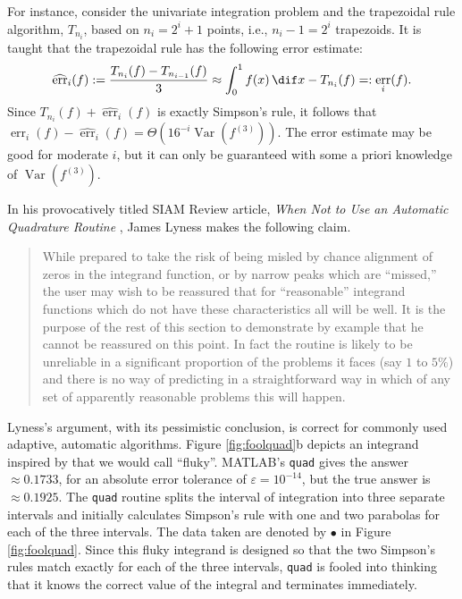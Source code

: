 \documentclass[]{elsarticle}
\DeclareMathOperator{\Var}{Var}
\DeclareMathOperator{\err}{err}
\newcommand{\herr}{\widehat{\err}}
\theoremstyle{definition}
\theoremstyle{remark}
\begin{document}
For instance, consider the univariate integration problem and the trapezoidal rule algorithm, $T_{n_i}$, based on $n_i=2^i+1$ points, i.e., $n_i-1=2^i$ trapezoids.  It is taught that the trapezoidal rule has the following error estimate:
\begin{equation} \label{traperrest}
\herr_i(f):=\frac{T_{n_{i}}(f)-T_{n_{i-1}}(f)}{3} \approx \int_0^1 f(x) \, \dif x - T_{n_i}(f) =:\err_i(f).
\end{equation}
Since $T_{n_i}(f)+ \herr_i(f)$ is exactly Simpson's rule, it follows that $\err_i(f) -\herr_i(f) = \Theta(16^{-i} \Var(f^{(3)}))$.  The error estimate may be good for moderate $i$, but it can only be guaranteed with some a priori knowledge of $\Var(f^{(3)})$.

In his provocatively titled SIAM Review article, \emph{When Not to Use an Automatic Quadrature Routine} \cite[p.\ 69]{Lyn83}, James Lyness makes the following claim.
\begin{quote}
While prepared to take the risk of being misled by chance alignment of zeros in the integrand function, or by narrow peaks which are ``missed,'' the user may wish to be reassured that for ``reasonable'' integrand functions which do not have these characteristics all will be well. It is the purpose of the rest of this section to demonstrate by example that he cannot be reassured on this point. In fact the routine is likely to be unreliable in a significant proportion of the problems it faces (say $1$ to $5\%$) and there is no way of predicting in a straightforward way in which of any set of apparently reasonable problems this will happen.
\end{quote}

Lyness's argument, with its pessimistic conclusion, is correct for commonly used adaptive, automatic algorithms.  Figure \ref{fig:foolquad}b depicts an integrand inspired by \cite{Lyn83} that we would call ``fluky''.  MATLAB's {\tt quad} gives the answer $\approx 0.1733$, for an absolute error tolerance of $\varepsilon=10^{-14}$, but the true answer is $\approx 0.1925$.  The {\tt quad} routine splits the interval of integration into three separate intervals and initially calculates Simpson's rule with one and two parabolas for each of the three intervals.  The data taken are denoted by $\bullet$ in Figure \ref{fig:foolquad}.  Since this fluky integrand is designed so that the two Simpson's rules match exactly for each of the three intervals, {\tt quad} is fooled into thinking that it knows the correct value of the integral and terminates immediately.
\end{document}
